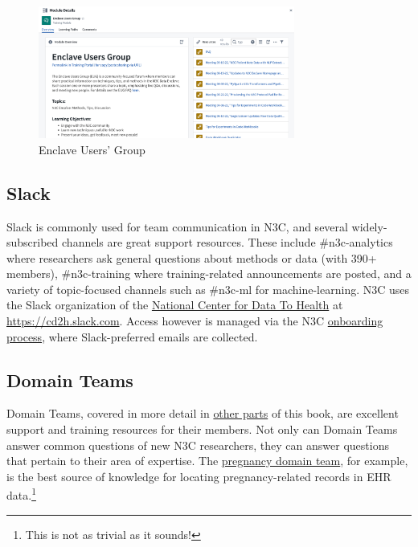 \documentclass[
  letterpaper,
  DIV=11,
  numbers=noendperiod]{scrreprt}
\begin{document}
\begin{figure}

{\centering \includegraphics[width=0.75\textwidth,height=\textheight]{chapters/images/support/image-21-eug.png}

}

\caption{\label{fig-support-eug}Enclave Users' Group}

\end{figure}

\hypertarget{sec-support-community-slack}{%
\subsection{Slack}\label{sec-support-community-slack}}

Slack is commonly used for team communication in N3C, and several
widely-subscribed channels are great support resources. These include
\#n3c-analytics where researchers ask general questions about methods or
data (with 390+ members), \#n3c-training where training-related
announcements are posted, and a variety of topic-focused channels such
as \#n3c-ml for machine-learning. N3C uses the Slack organization of the
\href{https://cd2h.org}{National Center for Data To Health} at
\url{https://cd2h.slack.com}. Access however is managed via the N3C
\protect\hyperlink{onboarding}{onboarding process}, where
Slack-preferred emails are collected.

\hypertarget{sec-support-community-dt}{%
\subsection{Domain Teams}\label{sec-support-community-dt}}

Domain Teams, covered in more detail in
\protect\hyperlink{domain-teams}{other parts} of this book, are
excellent support and training resources for their members. Not only can
Domain Teams answer common questions of new N3C researchers, they can
answer questions that pertain to their area of expertise. The
\href{https://covid.cd2h.org/pregnancy}{pregnancy domain team}, for
example, is the best source of knowledge for locating pregnancy-related
records in EHR data.\footnote{This is not as trivial as it sounds!}
\end{document}
